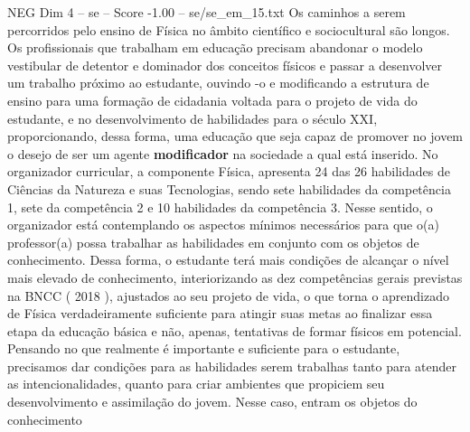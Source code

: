 \begin{textsample}{NEG Dim 4 – se – Score -1.00 – se/se\_em\_15.txt}
Os caminhos a serem percorridos pelo ensino de Física no âmbito científico e sociocultural são longos.
Os profissionais que trabalham em educação precisam abandonar o modelo vestibular de detentor e dominador dos conceitos físicos e passar a desenvolver um trabalho próximo ao estudante, ouvindo -o e modificando a estrutura de ensino para uma formação de cidadania voltada para o projeto de vida do estudante, e no desenvolvimento de habilidades para o século XXI, proporcionando, dessa forma, uma educação que seja capaz de promover no jovem o desejo de ser um agente \textbf{modificador} na sociedade a qual está inserido.
No organizador curricular, a componente Física, apresenta 24 das 26 habilidades de Ciências da Natureza e suas Tecnologias, sendo sete habilidades da competência 1, sete da competência 2 e 10 habilidades da competência 3.
Nesse sentido, o organizador está contemplando os aspectos mínimos necessários para que o(a) professor(a) possa trabalhar as habilidades em conjunto com os objetos de conhecimento.
Dessa forma, o estudante terá mais condições de alcançar o nível mais elevado de conhecimento, interiorizando as dez competências gerais previstas na BNCC ( 2018 ), ajustados ao seu projeto de vida, o que torna o aprendizado de Física verdadeiramente suficiente para atingir suas metas ao finalizar essa etapa da educação básica e não, apenas, tentativas de formar físicos em potencial.
Pensando no que realmente é importante e suficiente para o estudante, precisamos dar condições para as habilidades serem trabalhas tanto para atender as intencionalidades, quanto para criar ambientes que propiciem seu desenvolvimento e assimilação do jovem.
Nesse caso, entram os objetos do conhecimento

\end{textsample}
